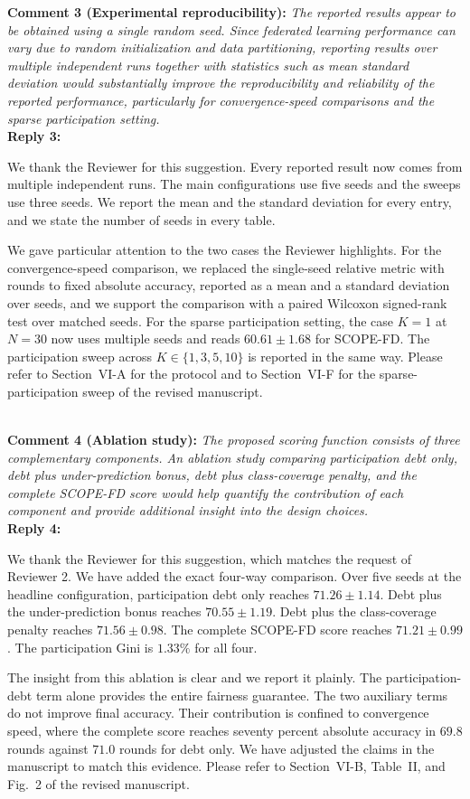 \documentclass[10pt]{article}
\begin{document}
\noindent
\textbf{Comment 3 (Experimental reproducibility):} \textit{The reported results appear to be obtained using a single random seed. Since federated learning performance can vary due to random initialization and data partitioning, reporting results over multiple independent runs together with statistics such as mean standard deviation would substantially improve the reproducibility and reliability of the reported performance, particularly for convergence-speed comparisons and the sparse participation setting.} \\
\noindent
\textbf{Reply 3:} {We thank the Reviewer for this suggestion. Every reported result now comes from multiple independent runs. The main configurations use five seeds and the sweeps use three seeds. We report the mean and the standard deviation for every entry, and we state the number of seeds in every table.

We gave particular attention to the two cases the Reviewer highlights. For the convergence-speed comparison, we replaced the single-seed relative metric with rounds to fixed absolute accuracy, reported as a mean and a standard deviation over seeds, and we support the comparison with a paired Wilcoxon signed-rank test over matched seeds. For the sparse participation setting, the case $K = 1$ at $N = 30$ now uses multiple seeds and reads $60.61 \pm 1.68$ for SCOPE-FD. The participation sweep across $K \in \{1, 3, 5, 10\}$ is reported in the same way. Please refer to Section~VI-A for the protocol and to Section~VI-F for the sparse-participation sweep of the revised manuscript.}\\

\noindent
\textbf{Comment 4 (Ablation study):} \textit{The proposed scoring function consists of three complementary components. An ablation study comparing participation debt only, debt plus under-prediction bonus, debt plus class-coverage penalty, and the complete SCOPE-FD score would help quantify the contribution of each component and provide additional insight into the design choices.} \\
\noindent
\textbf{Reply 4:} {We thank the Reviewer for this suggestion, which matches the request of Reviewer 2. We have added the exact four-way comparison. Over five seeds at the headline configuration, participation debt only reaches $71.26 \pm 1.14$. Debt plus the under-prediction bonus reaches $70.55 \pm 1.19$. Debt plus the class-coverage penalty reaches $71.56 \pm 0.98$. The complete SCOPE-FD score reaches $71.21 \pm 0.99$. The participation Gini is $1.33\%$ for all four.

The insight from this ablation is clear and we report it plainly. The participation-debt term alone provides the entire fairness guarantee. The two auxiliary terms do not improve final accuracy. Their contribution is confined to convergence speed, where the complete score reaches seventy percent absolute accuracy in $69.8$ rounds against $71.0$ rounds for debt only. We have adjusted the claims in the manuscript to match this evidence. Please refer to Section~VI-B, Table~II, and Fig.~2 of the revised manuscript.}\\
\end{document}
